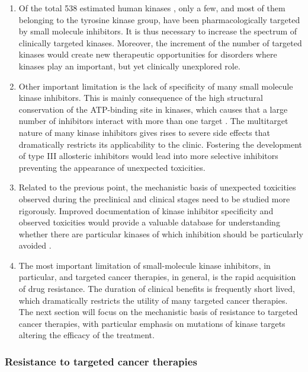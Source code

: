 \documentclass[12pt, b5paper,twoside]{tesi_upf}
\begin{document}
\begin{enumerate}

\item Of the total 538 estimated human kinases \cite{Manning2002}, only a few, and most of them belonging to the tyrosine kinase group, have been pharmacologically targeted by small molecule inhibitors. It is thus necessary to increase the spectrum of clinically targeted kinases. Moreover, the increment of the number of targeted kinases would create new therapeutic opportunities for disorders where kinases play an important, but yet clinically unexplored role. 
\item Other important limitation is the lack of specificity of many small molecule kinase inhibitors. This is mainly consequence of the high structural conservation of the ATP-binding site in kinases, which causes that a large number of inhibitors interact with more than one target \cite{Davis2011}. The multitarget nature of many kinase inhibitors gives rises to severe side effects that dramatically restricts its applicability to the clinic. Fostering the development of type III allosteric inhibitors would lead into more selective inhibitors preventing the appearance of unexpected toxicities.  
\item Related to the previous point, the mechanistic basis of unexpected toxicities observed during the preclinical and clinical stages need to be studied more rigorously. Improved documentation of kinase inhibitor specificity and observed toxicities would provide a valuable database for understanding whether there are particular kinases of which inhibition should be particularly avoided \cite{Zhang2009a}.
\item The most important limitation of small-molecule kinase inhibitors, in particular, and targeted cancer therapies, in general, is the rapid acquisition of drug resistance. The duration of clinical benefits is frequently short lived, which dramatically restricts the utility of many targeted cancer therapies. The next section will focus on the mechanistic basis of resistance to targeted cancer therapies, with particular emphasis on mutations of kinase targets altering the efficacy of the treatment.    
 \end{enumerate}
 


\subsubsection{Resistance to targeted cancer therapies}\label{resistance}
\end{document}
